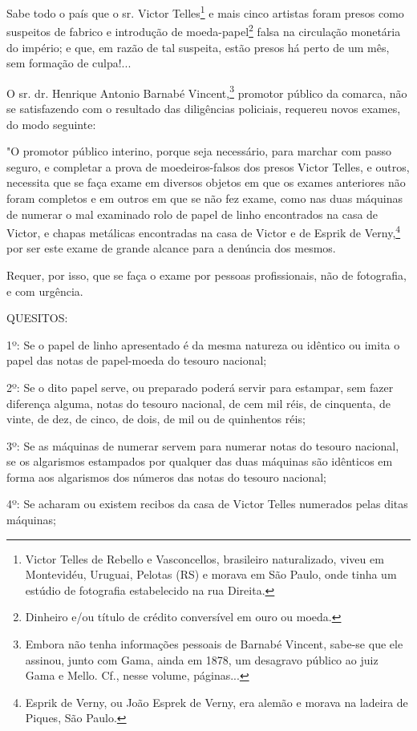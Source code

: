 Sabe todo o país que o sr. Victor Telles\footnote{Victor Telles de
  Rebello e Vasconcellos, brasileiro naturalizado, viveu em Montevidéu,
  Uruguai, Pelotas (RS) e morava em São Paulo, onde tinha um estúdio de
  fotografia estabelecido na rua Direita.} e mais cinco artistas foram
presos como suspeitos de fabrico e introdução de moeda-papel\footnote{
  Dinheiro e/ou título de crédito conversível em ouro ou moeda.} falsa
na circulação monetária do império; e que, em razão de tal suspeita,
estão presos há perto de um mês, sem formação de culpa!...

O sr. dr. Henrique Antonio Barnabé Vincent,\footnote{Embora não tenha
  informações pessoais de Barnabé Vincent, sabe-se que ele assinou,
  junto com Gama, ainda em 1878, um desagravo público ao juiz Gama e
  Mello. Cf., nesse volume, páginas...} promotor público da comarca, não
se satisfazendo com o resultado das diligências policiais, requereu
novos exames, do modo seguinte:

"O promotor público interino, porque seja necessário, para marchar com
passo seguro, e completar a prova de moedeiros-falsos dos presos Victor
Telles, e outros, necessita que se faça exame em diversos objetos em que
os exames anteriores não foram completos e em outros em que se não fez
exame, como nas duas máquinas de numerar o mal examinado rolo de papel
de linho encontrados na casa de Victor, e chapas metálicas encontradas
na casa de Victor e de Esprik de Verny,\footnote{Esprik de Verny, ou
  João Esprek de Verny, era alemão e morava na ladeira de Piques, São
  Paulo.} por ser este exame de grande alcance para a denúncia dos
mesmos.

Requer, por isso, que se faça o exame por pessoas profissionais, não de
fotografia, e com urgência.

QUESITOS:

1º: Se o papel de linho apresentado é da mesma natureza ou idêntico ou
imita o papel das notas de papel-moeda do tesouro nacional;

2º: Se o dito papel serve, ou preparado poderá servir para estampar, sem
fazer diferença alguma, notas do tesouro nacional, de cem mil réis, de
cinquenta, de vinte, de dez, de cinco, de dois, de mil ou de quinhentos
réis;

3º: Se as máquinas de numerar servem para numerar notas do tesouro
nacional, se os algarismos estampados por qualquer das duas máquinas são
idênticos em forma aos algarismos dos números das notas do tesouro
nacional;

4º: Se acharam ou existem recibos da casa de Victor Telles numerados
pelas ditas máquinas;


